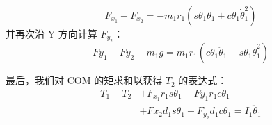 \begin{equation}
	F_{x_1} - F_{x_2} = 
		- m_1 r_1 
		(
			s \theta_1 \ddot{\theta}_1 + 
			c \theta_1 \dot{\theta}_1^2
		)
	\label{eq:8_10b}
\end{equation}
%
并再次沿 Y 方向计算 $F_{y_2}$：
\begin{equation}
	F y_1 - F y_2 - m_1 g  =  
		m_1 r_1
		(
			c \theta_1 \ddot{ \theta }_1 -
			s \theta_1 \dot{ \theta }_1^2
		)
	\label{eq:8_11}
\end{equation}

最后，我们对 COM 的矩求和以获得 $T_2$ 的表达式：
%
\begin{equation}
	\begin{aligned}
		T_1 - T_2 & + F_{x_1} r_1 s \theta_1 - F y_1 r_1 c \theta_1 \\
		& + F x_2 d_1 s \theta_1  -
			F_{y_2} d_1 c \theta_1
			= I_1 \ddot{\theta}_1
	\end{aligned}
	\label{eq:8_12}
\end{equation}










